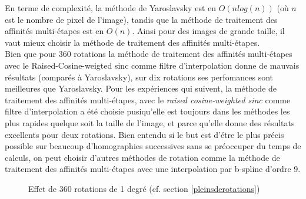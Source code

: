En terme de complexité, la méthode de Yaroslavsky est en $O(n log(n))$ (où $n$ est le nombre de pixel de l'image), tandis que la méthode de traitement des affinités multi-étapes est en $O(n)$. Ainsi pour des images de grande taille, il vaut mieux choisir la méthode de traitement des affinités multi-étapes.\\

Bien que pour 360 rotations la méthode de traitement des affinités multi-étapes avec  le  Raised-Cosine-weigted sinc comme filtre d'interpolation donne de mauvais résultats (comparés à Yaroslavsky), sur dix rotations ses perfomances sont meilleures que Yaroslavsky.
Pour les expériences qui suivent, la méthode de traitement des affinités multi-étapes, avec le \emph{raised cosine-weighted sinc} comme filtre d'interpolation a été choisie pusiqu'elle est toujours dans les méthodes les plus rapides quelque soit la taille de l'image, et parce qu'elle donne des résultats excellents pour deux rotations. 
Bien entendu si le but est d'étre le plus précis possible sur beaucoup d'homographies successives sans se préoccuper du temps de calculs, on peut choisir d'autres méthodes de rotation comme la méthode de traitement des affinités multi-étapes  avec une interpolation par b-spline d'ordre 9.

 \begin{figure}[h]
 \centering
  
\caption{Effet de 360 rotations de 1 degré (cf. section \ref{pleinsderotations})}
\label{troiscentrotations}
 \end{figure}

